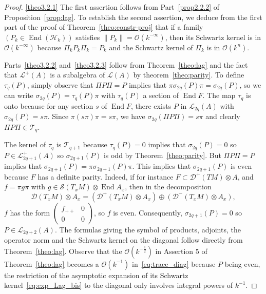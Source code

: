 \documentclass[10pt,a4paper]{article}
\theoremstyle{definition}
\numberwithin{equation}{section}
\newcommand{\si}{{\sigma}}
\newcommand{\op}{\operatorname}
\newcommand{\bigo}{\mathcal{O}}
\newcommand{\D}{\mathcal{D}}
\newcommand{\symb}{\mathcal{S}}
\newcommand{\lag}{\mathcal{L}}
\newcommand{\Hilb}{\mathcal{H}}
\newcommand{\clT}{\mathcal{T}}
\begin{document}
\begin{proof}
\eqref{theo3.2.1} The first assertion follows from Part~\eqref{prop2.2.2} of Proposition~\ref{prop:lag}. To establish the second assertion, we deduce from the first part of the
proof of Theorem~\ref{theo:constr-proj} that if a family $(P_k \in \op{End} (\Hilb_k))$ satisfies $\| P_k \| = \bigo (k^{-\infty})$, then its Schwartz kernel is in $\bigo (k^{-\infty})$ because $ \Pi_k P_k \Pi_k = P_k$ and the Schwartz kernel of $\Pi_k$ is in $\bigo (k^{n})$.

Parts~\eqref{theo3.2.2} and~\eqref{theo3.2.3} follow from Theorem~\ref{theo:lag} and the fact that $\lag ^{+} (A)$ is a subalgebra of $\lag (A)$ by theorem~\ref{theo:parity}. To define $\tau_q (P)$, simply observe that $\Pi P \Pi = P$ implies that $\pi \si_{2q} (P) \pi = \si_{2q}(P)$, so we can write $\si_{2q} (P) = \tau_q(P) \pi$ with $\tau_q (P)$ a section of $ \op{End} F$. The map $\tau_q$ is onto because for any section $s$ of $\op{End} F$, there exists $P$ in $ \lag_{2q} (A)$ with $\si_{2q} (P) = s \pi$. Since $\pi (s \pi) \pi = s
\pi$, we have $\si_{2q} (\Pi P \Pi) = s \pi$ and clearly $\Pi P \Pi \in
\clT_q$.

The kernel of $\tau_q$ is $\clT_{q+1}$ because $\tau_q (P) =0$ implies that $\si_{2q} (P) =0$ so $P \in \lag^{+}_{2q+1} (A)$ so $\si_{2q+1} (P)$ is odd by Theorem~\ref{theo:parity}. But $\Pi P \Pi = P$ implies that $\si_{2q+1} (P) = \pi \si_{2 q+1} (P) \pi$. This implies that $\si_{2q+1} (P)$ is even because $F$ has a definite parity. Indeed, if for instance $F \subset \D^+(TM) \otimes A$, and $f = \pi g \pi$ with $g \in \symb (T_xM) \otimes \op{End} A_x$, then
in the decomposition
\[
\D \left(T_xM\right) \otimes A_x = \left(\D^+ (T_xM) \otimes A_x\right) \oplus \left(\D^{-} (T_xM) \otimes
A_x\right),
\]
$f$ has the form $
(\begin{smallmatrix} f_{++} & 0 \\ 0 & 0
\end{smallmatrix})$, so $f$ is even. Consequently, $\si_{2q+1} (P) = 0$ so $P \in \lag_{2q+2} (A)$. The formulas giving the symbol of products, adjoints, the operator norm and the Schwartz kernel on the diagonal follow directly from Theorem~\ref{theo:lag}.  Observe that the $\bigo (k^{-\frac{1}{2}})$ in Assertion 5 of Theorem~\ref{theo:lag} becomes a $\bigo (k^{-1})$ in~\eqref{eq:trace_diag} because $P$ being even, the restriction of the asymptotic expansion of its Schwartz kernel~\eqref{eq:exp_Lag_bis} to the diagonal only involves integral powers of $k^{-1}$. 
\end{proof}
\end{document}
